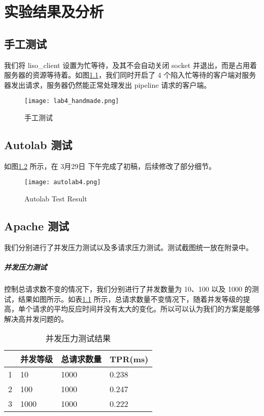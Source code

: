 

\chapter{实验结果及分析}

\section{手工测试}
我们将 liso\_client 设置为忙等待，及其不会自动关闭 socket 并退出，而是占用着服务器的资源等待着。如图\ref{fig:lab4test1}，我们同时开启了 4 个陷入忙等待的客户端对服务器发出请求，服务器仍然能正常处理发出 pipeline 请求的客户端。


\begin{figure}[htbp!]
    \centering 
    \texttt{[image: lab4\_handmade.png]}
    \caption{手工测试}
    \label{fig:lab4test1}
\end{figure}

\section{Autolab 测试} 如图\ref{fig:autolab4} 所示，在 3月29日 下午完成了初稿，后续修改了部分细节。

\begin{figure}[htbp!]
    \centering
    \texttt{[image: autolab4.png]}
    \caption{Autolab Test Result}\label{fig:autolab4}
\end{figure}

\section{Apache 测试} 

我们分别进行了并发压力测试以及多请求压力测试。测试截图统一放在附录中。

\paragraph*{并发压力测试} 控制总请求数不变的情况下，我们分别进行了并发数量为 10、100 以及 1000 的测试，结果如图所示。如表\ref{tab:parallel} 所示，总请求数量不变情况下，随着并发等级的提高，单个请求的平均反应时间并没有太大的变化。所以可以认为我们的方案是能够解决高并发问题的。

\begin{table}[htbp!]
    \centering
    \begin{tabular}{llll}\hline
      & 并发等级 & 总请求数量 & TPR(ms)   \\\hline
    1 & 10   & 1000  & 0.238 \\
    2 & 100  & 1000  & 0.247 \\
    3 & 1000 & 1000  & 0.222\\
    \hline
    \end{tabular}
    \caption{并发压力测试结果}\label{tab:parallel}
\end{table}

